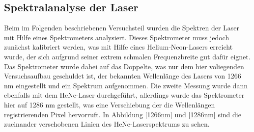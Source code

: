 \subsection{Spektralanalyse der Laser}
Beim im Folgenden beschriebenen Versuchsteil wurden die Spektren der Laser mit Hilfe eines Spektrometers analysiert. Dieses Spektrometer muss jedoch zunächst kalibriert werden, was mit Hilfe eines Helium-Neon-Lasers erreicht wurde, der sich aufgrund seiner extrem schmalen Frequenzbreite gut dafür eignet. \newline
Das Spektrometer wurde dabei auf das Doppelte, was nur dem hier voliegenden Versuchsaufbau geschuldet ist, der bekannten Wellenlänge des Lasers von 1266 nm eingestellt und ein Spektrum aufgenommen. Die zweite Messung wurde dann ebenfalls mit dem HeNe-Laser durchgeführt, allerdings wurde das Spektrometer hier auf 1286 nm gestellt, was eine Verschiebung der die Wellenlängen registrierenden Pixel hervorruft. In Abbildung \ref{1266nm} und \ref{1286nm} sind die zueinander verschobenen Linien des HeNe-Laserspektrums zu sehen.
\begin{figure}[H]
	\begin{center}
		\label{kalib}
	\end{center}
\end{figure}

